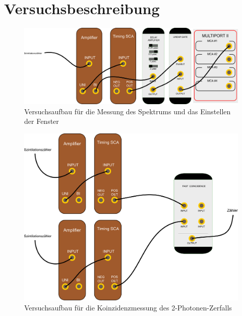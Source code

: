 \section{Versuchsbeschreibung}

\begin{figure}
 \includegraphics[width=\textwidth]{BilderAufbau/spektrum.pdf}
 \caption{Versuchsaufbau für die Messung des Spektrums und das Einstellen der Fenster}
\end{figure}

\begin{figure}
 \includegraphics[width=\textwidth]{BilderAufbau/2er-koinzidenz.pdf}
 \caption{Versuchsaufbau für die Koinzidenzmessung des 2-Photonen-Zerfalls}
\end{figure}

